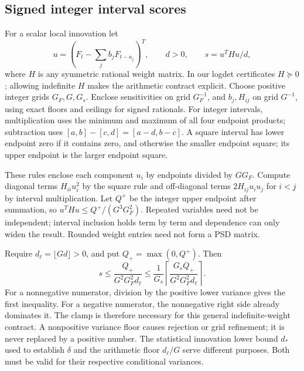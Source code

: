 \subsection{Signed integer interval scores}
\label{app:integer-scores}
For a scalar local innovation let
\[
 u=(F_t-\sum_j b_jF_{t-a_j})^T,\qquad d>0,\qquad s=u^THu/d,
\]
where $H$ is any symmetric rational weight matrix. In our logdet certificates
$H\succeq0$; allowing indefinite $H$ makes the arithmetic contract explicit.
Choose positive integer grids $G_F,G,G_s$. Enclose sensitivities on grid
$G_F^{-1}$, and $b_j,H_{ij}$ on grid $G^{-1}$, using exact floors and
ceilings for signed rationals. For integer intervals, multiplication uses
the minimum and maximum of all four endpoint products; subtraction uses
$[a,b]-[c,d]=[a-d,b-c]$. A square interval has lower endpoint zero if it
contains zero, and otherwise the smaller endpoint square; its upper endpoint
is the larger endpoint square.

These rules enclose each component $u_i$ by endpoints divided by $GG_F$.
Compute diagonal terms $H_{ii}u_i^2$ by the square rule and off-diagonal
terms $2H_{ij}u_iu_j$ for $i<j$ by interval multiplication. Let $Q^+$
be the integer upper endpoint after summation, so
$u^THu\le Q^+/(G^3G_F^2)$. Repeated variables need not be independent;
interval inclusion holds term by term and dependence can only widen the
result. Rounded weight entries need not form a PSD matrix.

Require $d_\ell=\lfloor Gd\rfloor>0$, and put $Q_+=\max(0,Q^+)$.
Then
\begin{equation}\label{eq:integer-arc-bound}
 s\le\frac{Q_+}{G^2G_F^2d_\ell}
 \le\frac1{G_s}\left\lceil
 \frac{G_s Q_+}{G^2G_F^2d_\ell}\right\rceil.
\end{equation}
For a nonnegative numerator, division by the positive lower variance gives
the first inequality. For a negative numerator, the nonnegative right side
already dominates it. The clamp is therefore necessary for this general
indefinite-weight contract. A nonpositive variance floor causes rejection
or grid refinement; it is never replaced by a positive number.
The statistical innovation lower bound $d_*$ used to establish $\delta$
and the arithmetic floor $d_\ell/G$ serve different purposes. Both must
be valid for their respective conditional variances.

